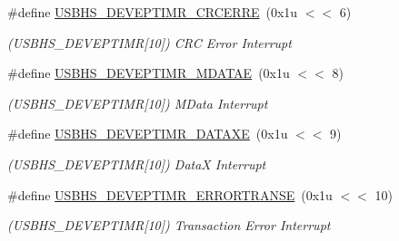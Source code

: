 \begin{DoxyCompactItemize}
\mbox{\label{group__SAMV71__USBHS_gaf11b63faa3c81681651d1c618d4a8896}} 
\#define \mbox{\hyperlink{group__SAMV71__USBHS_gaf11b63faa3c81681651d1c618d4a8896}{U\+S\+B\+H\+S\+\_\+\+D\+E\+V\+E\+P\+T\+I\+M\+R\+\_\+\+C\+R\+C\+E\+R\+RE}}~(0x1u $<$$<$ 6)
\begin{DoxyCompactList}\small\item\em (U\+S\+B\+H\+S\+\_\+\+D\+E\+V\+E\+P\+T\+I\+MR\mbox{[}10\mbox{]}) C\+RC Error Interrupt \end{DoxyCompactList}\item 
\mbox{\label{group__SAMV71__USBHS_ga8dbb85f27a0c6b5f6ddf2d3f7aee3c10}} 
\#define \mbox{\hyperlink{group__SAMV71__USBHS_ga8dbb85f27a0c6b5f6ddf2d3f7aee3c10}{U\+S\+B\+H\+S\+\_\+\+D\+E\+V\+E\+P\+T\+I\+M\+R\+\_\+\+M\+D\+A\+T\+AE}}~(0x1u $<$$<$ 8)
\begin{DoxyCompactList}\small\item\em (U\+S\+B\+H\+S\+\_\+\+D\+E\+V\+E\+P\+T\+I\+MR\mbox{[}10\mbox{]}) M\+Data Interrupt \end{DoxyCompactList}\item 
\mbox{\label{group__SAMV71__USBHS_gaf3e4e1efe7661d24c3cb60e370824a04}} 
\#define \mbox{\hyperlink{group__SAMV71__USBHS_gaf3e4e1efe7661d24c3cb60e370824a04}{U\+S\+B\+H\+S\+\_\+\+D\+E\+V\+E\+P\+T\+I\+M\+R\+\_\+\+D\+A\+T\+A\+XE}}~(0x1u $<$$<$ 9)
\begin{DoxyCompactList}\small\item\em (U\+S\+B\+H\+S\+\_\+\+D\+E\+V\+E\+P\+T\+I\+MR\mbox{[}10\mbox{]}) DataX Interrupt \end{DoxyCompactList}\item 
\mbox{\label{group__SAMV71__USBHS_ga39d2bc9137a99d759e889e72b20d5784}} 
\#define \mbox{\hyperlink{group__SAMV71__USBHS_ga39d2bc9137a99d759e889e72b20d5784}{U\+S\+B\+H\+S\+\_\+\+D\+E\+V\+E\+P\+T\+I\+M\+R\+\_\+\+E\+R\+R\+O\+R\+T\+R\+A\+N\+SE}}~(0x1u $<$$<$ 10)
\begin{DoxyCompactList}\small\item\em (U\+S\+B\+H\+S\+\_\+\+D\+E\+V\+E\+P\+T\+I\+MR\mbox{[}10\mbox{]}) Transaction Error Interrupt \end{DoxyCompactList}\item 
\mbox{\label{group__SAMV71__USBHS_gadaf4a6b6fc4cd4f3ccb9f038c0dd961c}} 

\end{DoxyCompactItemize}

